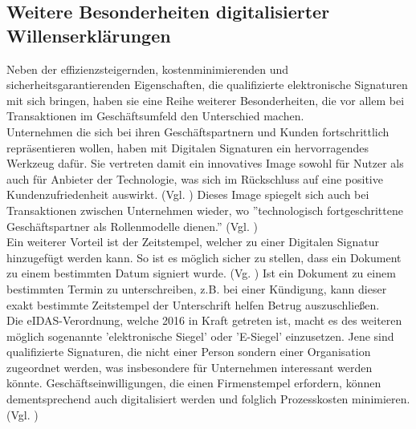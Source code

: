 \documentclass[deutsch]{lib/llncs/llncs}
\begin{document}
\subsection{Weitere Besonderheiten digitalisierter Willenserklärungen}
Neben der effizienzsteigernden, kostenminimierenden und sicherheitsgarantierenden Eigenschaften, die qualifizierte elektronische Signaturen mit sich bringen, haben sie eine Reihe weiterer Besonderheiten, die vor allem bei Transaktionen im Geschäftsumfeld den Unterschied machen. \\
Unternehmen die sich bei ihren Geschäftspartnern und Kunden fortschrittlich repräsentieren wollen, haben mit Digitalen Signaturen ein hervorragendes Werkzeug dafür. Sie vertreten damit ein innovatives Image sowohl für Nutzer als auch für Anbieter der Technologie, was sich im Rückschluss auf eine positive Kundenzufriedenheit auswirkt. (Vgl. \cite[S. 7]{Zitat05}) Dieses Image spiegelt sich auch bei Transaktionen zwischen Unternehmen wieder, wo ''technologisch fortgeschrittene Geschäftspartner als Rollenmodelle dienen.'' (Vgl. \cite[S. 12]{Zitat05}) \\
Ein weiterer Vorteil ist der Zeitstempel, welcher zu einer Digitalen Signatur hinzugefügt werden kann. So ist es möglich sicher zu stellen, dass ein Dokument zu einem bestimmten Datum signiert wurde. (Vg. \cite[S. 7]{Zitat05}) Ist ein Dokument zu einem bestimmten Termin zu unterschreiben, z.B. bei einer Kündigung, kann dieser exakt bestimmte Zeitstempel der Unterschrift helfen Betrug auszuschließen. \\
Die eIDAS-Verordnung, welche 2016 in Kraft getreten ist, macht es des weiteren möglich sogenannte 'elektronische Siegel' oder 'E-Siegel' einzusetzen. Jene sind qualifizierte Signaturen, die nicht einer Person sondern einer Organisation zugeordnet werden, was insbesondere für Unternehmen interessant werden könnte. Geschäftseinwilligungen, die einen Firmenstempel erfordern, können dementsprechend auch digitalisiert werden und folglich Prozesskosten minimieren. (Vgl. \cite[S. 30-31]{Zitat05})
\end{document}
